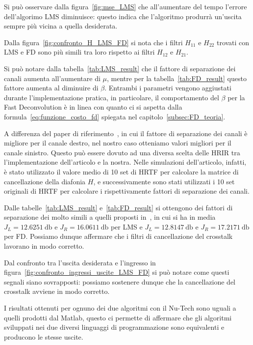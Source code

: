\documentclass[12pt,a4paper,titlepage]{article}
\begin{document}
Si può osservare dalla figura~\ref{fig:mse_LMS} che all'aumentare del tempo l'errore dell'algorimo LMS diminuisce: questo indica che l'algoritmo produrrà un'uscita sempre più vicina a quella desiderata. 

Dalla figura~\ref{fig:confronto_H_LMS_FD} si nota che i filtri $H_{11}$ e $H_{22}$ trovati con LMS e FD sono più simili tra loro rispetto ai filtri $H_{12}$ e $H_{21}$.

Si può notare dalla tabella~\ref{tab:LMS_result} che il fattore di separazione dei canali aumenta all'aumentare di $\mu$, mentre per la tabella~\ref{tab:FD_result} questo fattore aumenta al diminuire di $\beta$. Entrambi i parametri vengono aggiustati durante l'implementazione pratica, in particolare, il comportamento del $\beta$ per la Fast Deconvolution è in linea con quanto ci si aspetta dalla formula~\eqref{eq:funzione_costo_fd} spiegata nel capitolo~\ref{subsec:FD_teoria}.

A differenza del paper di riferimento~\cite{Li:comprehensive_comparison}, in cui il fattore di separazione dei canali è migliore per il canale destro, nel nostro caso otteniamo valori migliori per il canale sinistro. Questo può essere dovuto ad una diversa scelta delle HRIR tra l'implementazione dell'articolo e la nostra. Nelle simulazioni dell'articolo, infatti, è stato utilizzato il valore medio di 10 set di HRTF per calcolare la matrice di cancellazione della diafonia $H$, e successivamente sono stati utilizzati i 10 set originali di HRTF per calcolare i rispettivamente fattori di separazione dei canali.

Dalle tabelle~\ref{tab:LMS_result} e~\ref{tab:FD_result} si ottengono dei fattori di separazione dei molto simili a quelli proposti in~\cite{Li:comprehensive_comparison}, in cui si ha in media $J_L = \SI{12.6251}{\decibel}$ e $J_R = \SI{16.0611}{\decibel}$ per LMS e $J_L = \SI{12.8147}{\decibel}$ e $J_R = \SI{17.2171}{\decibel}$ per FD. Possiamo dunque affermare che i filtri di cancellazione del crosstalk lavorano in modo corretto.

Dal confronto tra l'uscita desiderata e l'ingresso in figura~\ref{fig:confronto_ingressi_uscite_LMS_FD} si può notare come questi segnali siano sovrapposti: possiamo sostenere dunque che la cancellazione del crosstalk avviene in modo corretto.

I risultati ottenuti per ognuno dei due algoritmi con il Nu-Tech sono uguali a quelli prodotti dal Matlab, questo ci permette di affermare che gli algoritmi sviluppati nei due diversi linguaggi di programmazione sono equivalenti e producono le stesse uscite.

\clearpage 
\nocite{*}
\printbibliography
\end{document}
